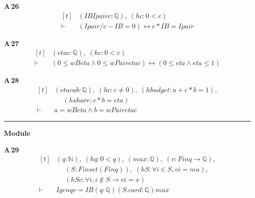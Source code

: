 \noindent\textbf{A\,26}\quad{}
{\footnotesize\[ \begin{aligned}[t]
&(\mathit{IB} \mathit{Ipair} \mathit{c} : \mathbb{Q} ),\; (\mathit{hc} : 0 < \mathit{c})\\
\vdash\;&(\mathit{Ipair} / \mathit{c} - \mathit{IB} = 0) \leftrightarrow \mathit{c} * \mathit{IB} = \mathit{Ipair}
\end{aligned} \]}

\noindent\textbf{A\,27}\quad{}
{\footnotesize\[ \begin{aligned}[t]
&(\mathit{eta} \mathit{c} : \mathbb{Q} ),\; (\mathit{hc} : 0 < \mathit{c})\\
\vdash\;&(0 \leq \mathit{wB} \mathit{eta} \wedge 0 \leq \mathit{wPair} \mathit{eta} \mathit{c}) \leftrightarrow (0 \leq \mathit{eta} \wedge \mathit{eta} \leq 1)
\end{aligned} \]}

\noindent\textbf{A\,28}\quad{}
{\footnotesize\[ \begin{aligned}[t]
&(\mathit{eta} \mathit{c} \mathit{a} \mathit{b} : \mathbb{Q} ),\; (\mathit{hc} : \mathit{c} \neq 0),\; (\mathit{hbudget} : \mathit{a} + \mathit{c} * \mathit{b} = 1),\\
&\quad \; (\mathit{hshare} : \mathit{c} * \mathit{b} = \mathit{eta})\\
\vdash\;&\mathit{a} = \mathit{wB} \mathit{eta} \wedge \mathit{b} = \mathit{wPair} \mathit{eta} \mathit{c}
\end{aligned} \]}

\vspace{4pt}\noindent\rule{\columnwidth}{0.4pt}\par\vspace{2pt}
\noindent\textbf{Module }\par\vspace{3pt}

\noindent\textbf{A\,29}\quad{}
{\footnotesize\[ \begin{aligned}[t]
&(\mathit{q} : \mathbb{N} ),\; (\mathit{hq} : 0 < \mathit{q}),\; (\mathit{mu} \mathit{x} : \mathbb{Q} ),\; (\mathit{v} : \mathit{Fin} \mathit{q} \to \mathbb{Q} ),\\
&\quad \; (\mathit{S} : \mathit{Finset} (\mathit{Fin} \mathit{q})),\; (\mathit{hS} : \forall \mathit{i} \in \mathit{S}, \mathit{v} \mathit{i} = \mathit{mu}),\\
&\quad \; (\mathit{hSc} : \forall \mathit{i}, \mathit{i} \notin \mathit{S} \to \mathit{v} \mathit{i} = \mathit{x})\\
\vdash\;&\mathit{Igen} \mathit{q} \mathit{v} = \mathit{IB} (\mathit{q} : \mathbb{Q} ) (\mathit{S}.\mathit{card} : \mathbb{Q} ) \mathit{mu} \mathit{x}
\end{aligned} \]}


